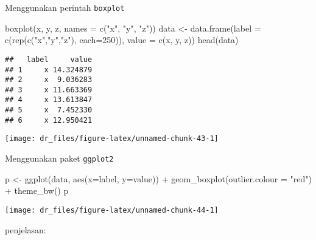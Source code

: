 \documentclass[
]{book}
\newenvironment{Shaded}{\begin{snugshade}}{\end{snugshade}}
\newcommand{\AttributeTok}[1]{\textcolor[rgb]{0.77,0.63,0.00}{#1}}
\newcommand{\DecValTok}[1]{\textcolor[rgb]{0.00,0.00,0.81}{#1}}
\newcommand{\FunctionTok}[1]{\textcolor[rgb]{0.00,0.00,0.00}{#1}}
\newcommand{\NormalTok}[1]{#1}
\newcommand{\OtherTok}[1]{\textcolor[rgb]{0.56,0.35,0.01}{#1}}
\newcommand{\SpecialCharTok}[1]{\textcolor[rgb]{0.00,0.00,0.00}{#1}}
\newcommand{\StringTok}[1]{\textcolor[rgb]{0.31,0.60,0.02}{#1}}
\begin{document}
Menggunakan perintah \texttt{boxplot}

\begin{Shaded}
\begin{Highlighting}[]
\FunctionTok{boxplot}\NormalTok{(x, y, z,}
        \AttributeTok{names =} \FunctionTok{c}\NormalTok{(}\StringTok{"x"}\NormalTok{, }\StringTok{"y"}\NormalTok{, }\StringTok{"z"}\NormalTok{))}
\NormalTok{data }\OtherTok{\textless{}{-}} \FunctionTok{data.frame}\NormalTok{(}\AttributeTok{label =} \FunctionTok{c}\NormalTok{(}\FunctionTok{rep}\NormalTok{(}\FunctionTok{c}\NormalTok{(}\StringTok{"x"}\NormalTok{,}\StringTok{"y"}\NormalTok{,}\StringTok{"z"}\NormalTok{),}
                                 \AttributeTok{each=}\DecValTok{250}\NormalTok{)),}
                   \AttributeTok{value =} \FunctionTok{c}\NormalTok{(x, y, z))}
\FunctionTok{head}\NormalTok{(data)}
\end{Highlighting}
\end{Shaded}

\begin{verbatim}
##   label     value
## 1     x 14.324879
## 2     x  9.036283
## 3     x 11.663369
## 4     x 13.613847
## 5     x  7.452330
## 6     x 12.950421
\end{verbatim}

\begin{center}\texttt{[image: dr\_files/figure-latex/unnamed-chunk-43-1]} \end{center}

Menggunakan paket \texttt{ggplot2}

\begin{Shaded}
\begin{Highlighting}[]
\NormalTok{p }\OtherTok{\textless{}{-}} \FunctionTok{ggplot}\NormalTok{(data, }\FunctionTok{aes}\NormalTok{(}\AttributeTok{x=}\NormalTok{label, }\AttributeTok{y=}\NormalTok{value)) }\SpecialCharTok{+}
  \FunctionTok{geom\_boxplot}\NormalTok{(}\AttributeTok{outlier.colour =} \StringTok{"red"}\NormalTok{) }\SpecialCharTok{+}
  \FunctionTok{theme\_bw}\NormalTok{()}
\NormalTok{p}
\end{Highlighting}
\end{Shaded}

\begin{center}\texttt{[image: dr\_files/figure-latex/unnamed-chunk-44-1]} \end{center}

penjelasan:
\end{document}
